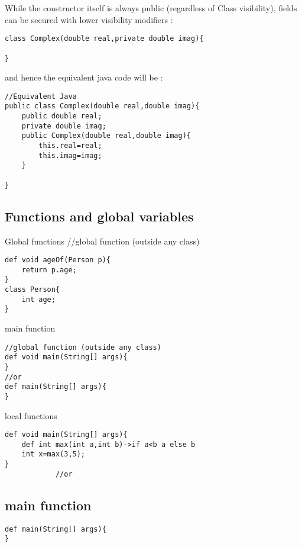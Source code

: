 \documentclass{tufte-book}
\begin{document}
            While the constructor itself is always public (regardless of Class visibility), fields can be secured with lower visibility modifiers :

            \begin{lstlisting}
class Complex(double real,private double imag){

}
            \end{lstlisting}
            and hence the equivalent java code will be :

            \begin{lstlisting}
//Equivalent Java
public class Complex(double real,double imag){
    public double real;
    private double imag;
    public Complex(double real,double imag){
        this.real=real;
        this.imag=imag;
    }

}
            \end{lstlisting}



            \subsection{Functions and global variables}
            Global functions
//global function (outside any class)
            \begin{lstlisting}
def void ageOf(Person p){
    return p.age;
}
class Person{
    int age;
}
            \end{lstlisting}
            main function
            \begin{lstlisting}
//global function (outside any class)
def void main(String[] args){
}
//or
def main(String[] args){
}
            \end{lstlisting}
            local functions
            \begin{lstlisting}
def void main(String[] args){
    def int max(int a,int b)->if a<b a else b
    int x=max(3,5);
}
            //or
            \end{lstlisting}


            \subsection{main function}
            \begin{lstlisting}
def main(String[] args){
}
            \end{lstlisting}
\end{document}
